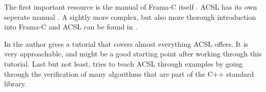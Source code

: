 The first important resource is the manual of Frama-C itself \cite{correnson_frama-c_nodate}. ACSL has its own seperate manual \cite{baudin_acsl_nodate}. A sightly more complex, but also more thorough introduction into Frama-C and ACSL can be found in \cite{prevosto_acsl_nodate}. 

In \cite{blanchard_introduction_2020} the author gives a tutorial that covers almost everything ACSL offers. It is very approachable, and might be a good starting point after working through this tutorial. Last but not least, \cite{gerlach_acsl_2020} tries to teach ACSL through examples by going through the verification of many algorithms that are part of the C++ standard library. 
